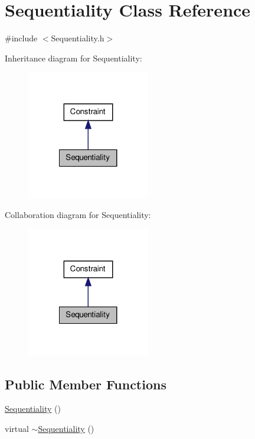 \hypertarget{classSequentiality}{\section{\-Sequentiality \-Class \-Reference}
\label{classSequentiality}
}


{\ttfamily \#include $<$\-Sequentiality.\-h$>$}



\-Inheritance diagram for \-Sequentiality\-:
\nopagebreak
\begin{figure}[H]
\begin{center}
\leavevmode
\includegraphics[width=152pt]{classSequentiality__inherit__graph}
\end{center}
\end{figure}


\-Collaboration diagram for \-Sequentiality\-:
\nopagebreak
\begin{figure}[H]
\begin{center}
\leavevmode
\includegraphics[width=152pt]{classSequentiality__coll__graph}
\end{center}
\end{figure}
\subsection*{\-Public \-Member \-Functions}
\begin{DoxyCompactItemize}
\item 
\hyperlink{classSequentiality_a3d8c4d770b1e057ffe207c47f5db6179}{\-Sequentiality} ()
\item 
virtual \hyperlink{classSequentiality_a7c44312ff2bacacc1716da7594767fbc}{$\sim$\-Sequentiality} ()
\end{DoxyCompactItemize}
